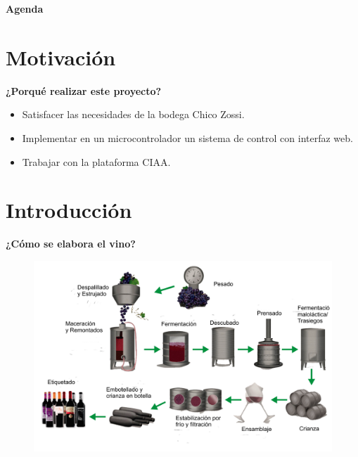 \documentclass[11pt]{beamer}
\begin{document}
\begin{frame}{\textbf{\LARGE{Agenda}}}
  \fontsize{18pt}{18}\selectfont
  \tableofcontents
\end{frame}

\section{Motivación}
\begin{frame}{\textbf{\LARGE{¿Porqué realizar este proyecto?}}}
  \fontsize{18pt}{18}\selectfont
  \vspace{-30px}
  \begin{itemize}
    \item Satisfacer las necesidades de la bodega Chico Zossi.
      \vspace{5px}
    \item Implementar en un microcontrolador un sistema de control con interfaz web.
      \vspace{5px}
    \item Trabajar con la plataforma CIAA.
  \end{itemize}
\end{frame}

\section{Introducción}

\begin{frame}{\textbf{\LARGE{¿Cómo se elabora el vino?}}}
  \fontsize{18pt}{18}\selectfont
  \hspace{-40px}
  \vspace{-30px}
  \begin{figure}[H]
    \includegraphics[width=1\textwidth]{./imagenes/elaboracion-del-vino-tinto.png}
  \end{figure}	  	  	
\end{frame}
\end{document}
